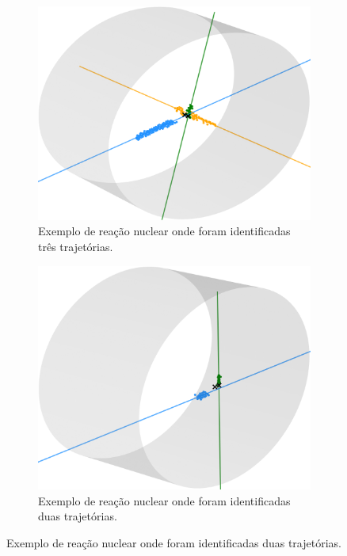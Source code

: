 \documentclass[a4paper,12pt,oneside]{book}
\begin{document}
\begin{figure}[H]
\centering
    \begin{subfigure}[b]{\textwidth}
        \centering
        \includegraphics[scale = 0.3]{figs/results_ex_3_tracks_2.png}
        \caption{Exemplo de reação nuclear onde foram identificadas três trajetórias.}
        \label{subfig:res_exemplo_3_tracks}
    \end{subfigure}%
    \hfill
    \begin{subfigure}[t]{0.45\textwidth}
        \centering
        \includegraphics[scale=0.4, width=.95\columnwidth]{figs/results_ex_2_tracks_3.png}
        \caption{Exemplo de reação nuclear onde foram identificadas duas trajetórias.}

\end{subfigure}
\end{figure}
\end{document}
